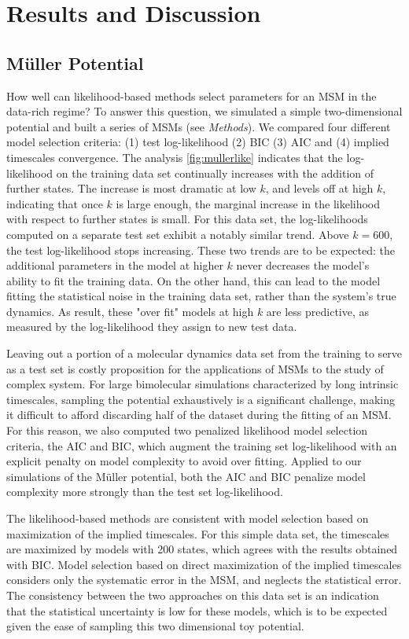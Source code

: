 \documentclass[journal=jpcbfk, layout=traditional, manuscript=article]{achemso}
\begin{document}
\section{Results and Discussion}
\subsection{M\"{u}ller Potential}

How well can likelihood-based methods select parameters for an MSM in the data-rich regime? To answer this question, we simulated a simple two-dimensional potential and built a series of MSMs (see \emph{Methods}). We compared four different model selection criteria: (1) test log-likelihood (2) BIC (3) AIC and (4) implied timescales convergence. The analysis \cref{fig:mullerlike} indicates that the log-likelihood on the training data set continually increases with the addition of further states. The increase is most dramatic at low $k$, and levels off at high $k$, indicating that once $k$ is large enough, the marginal increase in the likelihood with respect to further states is small. For this data set, the log-likelihoods computed on a separate test set exhibit a notably similar trend. Above $k=600$, the test log-likelihood stops increasing. These two trends are to be expected: the additional parameters in the model at higher $k$ never decreases the model's ability to fit the training data. On the other hand, this can lead to the model fitting the statistical noise in the training data set, rather than the system's true dynamics. As result, these "over fit" models at high $k$ are less predictive, as measured by the log-likelihood they assign to new test data.

Leaving out a portion of a molecular dynamics data set from the training to serve as a test set is costly proposition for the applications of MSMs to the study of complex system. For large bimolecular simulations characterized by long intrinsic timescales, sampling the potential exhaustively is a significant challenge\cite{Lane2012}, making it difficult to afford discarding half of the dataset during the fitting of an MSM. For this reason, we also computed two penalized likelihood model selection criteria, the AIC and BIC, which augment the training set log-likelihood with an explicit penalty on model complexity to avoid over fitting. Applied to our simulations of the M\"{u}ller potential, both the AIC and BIC penalize model complexity more strongly than the test set log-likelihood.

The likelihood-based methods are consistent with model selection based on maximization of the implied timescales. For this simple data set, the timescales are maximized by models with 200 states, which agrees with the results obtained with BIC. Model selection based on direct maximization of the implied timescales considers only the systematic error in the MSM, and neglects the statistical error. The consistency between the two approaches on this data set is an indication that the statistical uncertainty is low for these models, which is to be expected given the ease of sampling this two dimensional toy potential.
\end{document}
